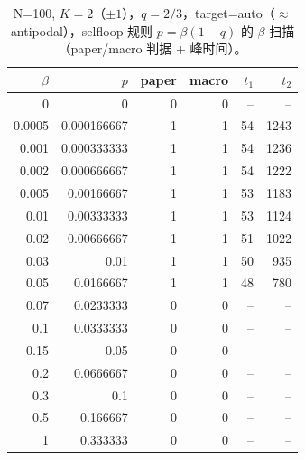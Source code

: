 \begin{table}[!htbp]
\centering
\small
\begin{tabular}{rrrrrr}
\toprule
$\beta$ & $p$ & paper & macro & $t_1$ & $t_2$\\
\midrule
0 & 0 & 0 & 0 & -- & --\\
0.0005 & 0.000166667 & 1 & 1 & 54 & 1243\\
0.001 & 0.000333333 & 1 & 1 & 54 & 1236\\
0.002 & 0.000666667 & 1 & 1 & 54 & 1222\\
0.005 & 0.00166667 & 1 & 1 & 53 & 1183\\
0.01 & 0.00333333 & 1 & 1 & 53 & 1124\\
0.02 & 0.00666667 & 1 & 1 & 51 & 1022\\
0.03 & 0.01 & 1 & 1 & 50 & 935\\
0.05 & 0.0166667 & 1 & 1 & 48 & 780\\
0.07 & 0.0233333 & 0 & 0 & -- & --\\
0.1 & 0.0333333 & 0 & 0 & -- & --\\
0.15 & 0.05 & 0 & 0 & -- & --\\
0.2 & 0.0666667 & 0 & 0 & -- & --\\
0.3 & 0.1 & 0 & 0 & -- & --\\
0.5 & 0.166667 & 0 & 0 & -- & --\\
1 & 0.333333 & 0 & 0 & -- & --\\
\bottomrule
\end{tabular}
\caption{N=100, $K=2$（$\pm 1$），$q=2/3$，target=auto（$\approx$ antipodal），selfloop 规则 $p=\beta(1-q)$ 的 $\beta$ 扫描（paper/macro 判据 + 峰时间）。}
\label{tab:beta-scan-N100-K2}
\end{table}
